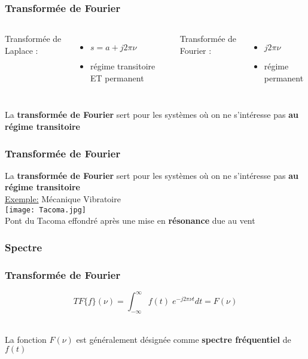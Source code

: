 \documentclass{beamer}
\begin{document}
\begin{frame}
\frametitle{Transformée de Fourier}
\begin{columns}
\column{60mm}
Transformée de Laplace : 
\vspace{0.4cm}
\begin{itemize} 
\item $s = a + j 2 \pi \nu$
\vspace{0.4cm}
\item régime transitoire ET permanent
\end{itemize}
\column{60mm}
Transformée de Fourier :
\vspace{0.4cm}
\begin{itemize}
\item $j 2 \pi \nu$ 
\vspace{0.4cm}
\item  régime permanent 
\end{itemize}
\end{columns}
\vspace{1cm}
La \textbf{transformée  de Fourier} sert pour les systèmes où on ne s'intéresse pas \textbf{au régime transitoire}\\
\end{frame}

\begin{frame}
\frametitle{Transformée de Fourier}
La \textbf{transformée  de Fourier} sert pour les systèmes où on ne s'intéresse pas \textbf{au régime transitoire}\\
\vspace{0.5cm}
\underline{Exemple:} Mécanique Vibratoire \\
\center
\texttt{[image: Tacoma.jpg]}\\
\footnotesize{Pont du Tacoma effondré après une mise en \textbf{résonance} due au vent}
\end{frame}

\subsubsection{Spectre}
\begin{frame}
\frametitle{Transformée de Fourier}
\[ TF\{ f \}(\nu) = \displaystyle \int^{\infty}_{-\infty} f(t) \; e^{-j2\pi \nu t} dt   = F(\nu) \]\\
\vspace{1cm}

La fonction $F(\nu)$ est généralement désignée comme \textbf{spectre fréquentiel} de $f(t)$ \\

\vspace{1cm}

\end{frame}
\end{document}
